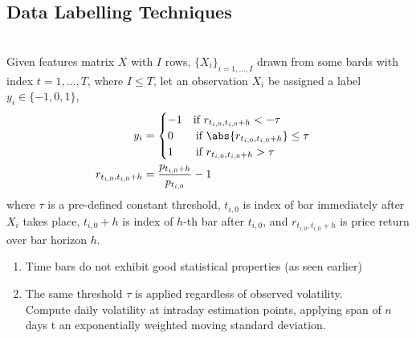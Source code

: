 \subsection{Data Labelling Techniques}

\begin{method} \\
Given features matrix $X$ with $I$ rows, $\{X_i\}_{i = 1, \ldots, I}$ drawn from some bards with index $t = 1, \ldots, T$, where $I \leq T$, let an observation $X_i$ be assigned a label $y_i \in \{-1, 0, 1\}$,
\begin{align*}
y_i &=
\begin{cases}
-1 \ \ \ \text{if } r_{t_{i,0}, t_{i,0} + h} < -\tau \\
0 \ \ \ \ \ \ \text{if } \abs{r_{t_{i,0}, t_{i,0} + h}} \leq \tau \\
1 \ \ \ \ \ \ \text{if } r_{t_{i,0}, t_{i,0} + h} > \tau
\end{cases} \nonumber \\
r_{t_{i,0}, t_{i,0} + h} &= \frac{p_{t_{i,0}+h}}{p_{t_{i,0}}} - 1 \nonumber
\end{align*}
where $\tau$ is a pre-defined constant threshold, $t_{i,0}$ is index of bar immediately after $X_i$ takes place, $t_{i,0} + h$ is index of $h$-th bar after $t_{i,0}$, and $r_{t_{i,0}, t_{i,0} + h}$ is price return over bar horizon $h$.
\end{method}

\begin{remark} 
\begin{enumerate}[label=\roman*.]
\setlength{\itemsep}{0pt}
\item Time bars do not exhibit good statistical properties (as seen earlier)
\item The same threshold $\tau$ is applied regardless of observed volatility.\\
Compute daily volatility at intraday estimation points, applying span of $n$ days t an exponentially weighted moving standard deviation.
\end{enumerate}
\end{remark}

